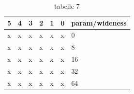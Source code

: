 \begin{table}[H]
\centering
\caption{tabelle 7}
\label{Integer overflow bug detection in CWE-190}
\begin{tabular}{|l|l|l|l|l|l|l|} \hline
\textbf{5}  & \textbf{4}     & \textbf{3}    &\textbf{2} & \textbf{1}  & \textbf{0} &\textbf{param/wideness}  \\ \hline 
x           &x               &x              &x          &x            &x           &0                         \\ \hline
x           &x               &x              &x          &x            &x           &8                         \\ \hline
x           &x               &x              &x          &x            &x           &16                         \\ \hline
x           &x               &x              &x          &x            &x           &32                         \\ \hline
x           &x               &x              &x          &x            &x           &64                         \\ \hline

\end{tabular}
\end{table}

% 

